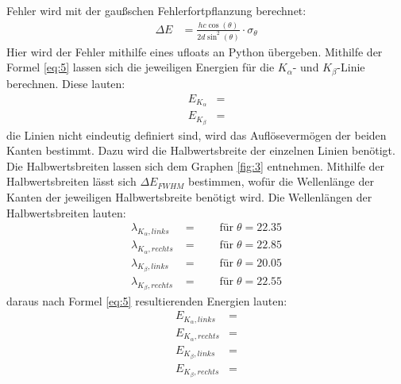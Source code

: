     \justifying Fehler wird mit der gaußschen Fehlerfortpflanzung berechnet:
    \begin{align} 
    \Delta E &= \frac{hc \cos(\theta)}{2d\sin^2(\theta)} \cdot \sigma_{\theta}
    \end{align}
    Hier wird der Fehler mithilfe eines ufloats \cite{uncertainties} an Python übergeben. 
    Mithilfe der Formel \eqref{eq:5} lassen sich die jeweiligen Energien für die $K_{\alpha}$- und $K_{\beta}$-Linie
    berechnen. Diese lauten:
    \begin{subequations}\label{eq:13}
    \begin{align}
        E_{K_{\alpha}} &= \text{} \label{eq:13a}\\
        E_{K_{\beta}} &= \text{} \label{eq:13b}
    \end{align}
    \end{subequations}
    \justifying die Linien nicht eindeutig definiert sind, wird das Auflösevermögen der beiden Kanten bestimmt. Dazu wird die 
    Halbwertsbreite der einzelnen Linien benötigt. Die Halbwertsbreiten lassen sich dem Graphen \ref{fig:3} entnehmen. Mithilfe der 
    Halbwertsbreiten lässt sich $\Delta E_{FWHM}$ bestimmen, wofür die Wellenlänge der Kanten der jeweiligen Halbwertsbreite benötigt wird. 
    Die Wellenlängen der Halbwertsbreiten lauten:
    \begin{subequations}\label{eq:14}
    \begin{align}
        \lambda_{K_{\alpha},links} &= \text{} \qquad \text{für}\;\theta = 22.35 \label{eq:14a}\\
        \lambda_{K_{\alpha},rechts} &= \text{} \qquad \text{für}\;\theta = 22.85 \label{eq:14b}\\
        \lambda_{K_{\beta},links} &= \text{} \qquad \text{für}\;\theta = 20.05 \label{eq:14c}\\
        \lambda_{K_{\beta},rechts} &= \text{} \qquad \text{für}\;\theta = 22.55 \label{eq:14d}
    \end{align}
    \end{subequations}
    \justifying daraus nach Formel \eqref{eq:5} resultierenden Energien lauten:
    \begin{subequations}\label{eq:15}
    \begin{align}
        E_{K_{\alpha},links} &= \text{} \label{eq:15a}\\
        E_{K_{\alpha},rechts} &= \text{} \label{eq:15b}\\
        E_{K_{\beta},links} &= \text{} \label{eq:15c}\\
        E_{K_{\beta},rechts} &= \text{} \label{eq:15d}
    \end{align}
    \end{subequations}

